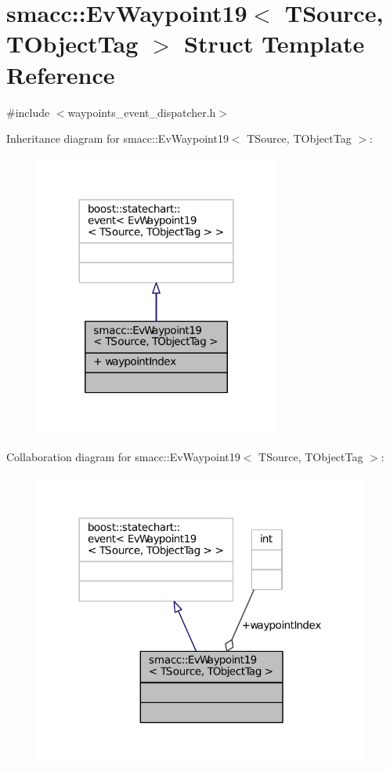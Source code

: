 \hypertarget{structsmacc_1_1EvWaypoint19}{}\section{smacc\+:\+:Ev\+Waypoint19$<$ T\+Source, T\+Object\+Tag $>$ Struct Template Reference}
\label{structsmacc_1_1EvWaypoint19}


{\ttfamily \#include $<$waypoints\+\_\+event\+\_\+dispatcher.\+h$>$}



Inheritance diagram for smacc\+:\+:Ev\+Waypoint19$<$ T\+Source, T\+Object\+Tag $>$\+:
\nopagebreak
\begin{figure}[H]
\begin{center}
\leavevmode
\includegraphics[width=227pt]{structsmacc_1_1EvWaypoint19__inherit__graph}
\end{center}
\end{figure}


Collaboration diagram for smacc\+:\+:Ev\+Waypoint19$<$ T\+Source, T\+Object\+Tag $>$\+:
\nopagebreak
\begin{figure}[H]
\begin{center}
\leavevmode
\includegraphics[width=312pt]{structsmacc_1_1EvWaypoint19__coll__graph}
\end{center}
\end{figure}
